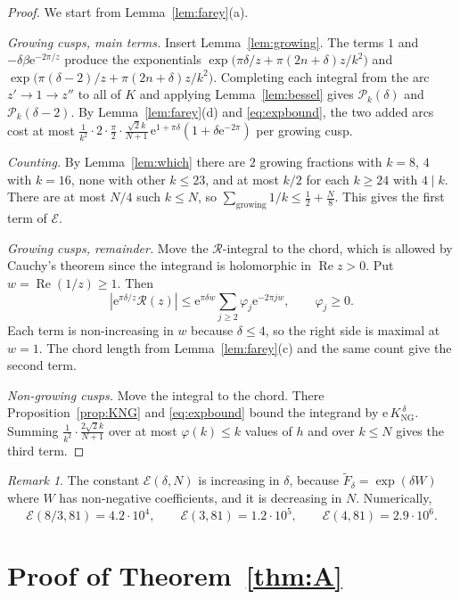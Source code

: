 \documentclass[11pt]{amsart}
\theoremstyle{remark}
\newtheorem{remark}[theorem]{Remark}
\theoremstyle{definition}
\newcommand{\cP}{\mathcal P}
\newcommand{\cE}{\mathcal E}
\newcommand{\cR}{\mathcal R}
\newcommand{\Rea}{\operatorname{Re}}
\newcommand{\e}{\mathrm e}
\newcommand{\KNG}{K_{\mathrm{NG}}}
\begin{document}
\begin{proof}
We start from Lemma~\ref{lem:farey}(a).

\emph{Growing cusps, main terms.} Insert Lemma~\ref{lem:growing}. The terms $1$ and $-\delta\beta\e^{-2\pi/z}$ produce the exponentials $\exp\big(\pi\delta/z+\pi(2n+\delta)z/k^2\big)$ and $\exp\big(\pi(\delta-2)/z+\pi(2n+\delta)z/k^2\big)$. Completing each integral from the arc $z'\to1\to z''$ to all of $K$ and applying Lemma~\ref{lem:bessel} gives $\cP_k(\delta)$ and $\cP_k(\delta-2)$. By Lemma~\ref{lem:farey}(d) and \eqref{eq:expbound}, the two added arcs cost at most $\frac1{k^2}\cdot2\cdot\frac\pi2\cdot\frac{\sqrt2k}{N+1}\,\e^{1+\pi\delta}(1+\delta\e^{-2\pi})$ per growing cusp.

\emph{Counting.} By Lemma~\ref{lem:which} there are $2$ growing fractions with $k=8$, $4$ with $k=16$, none with other $k\le23$, and at most $k/2$ for each $k\ge24$ with $4\mid k$. There are at most $N/4$ such $k\le N$, so $\sum_{\text{growing}}1/k\le\frac12+\frac N8$. This gives the first term of $\cE$.

\emph{Growing cusps, remainder.} Move the $\cR$-integral to the chord, which is allowed by Cauchy's theorem since the integrand is holomorphic in $\Rea z>0$. Put $w=\Rea(1/z)\ge1$. Then
\[
|\e^{\pi\delta/z}\cR(z)|\le\e^{\pi\delta w}\sum_{j\ge2}\varphi_j\e^{-2\pi jw},\qquad \varphi_j\ge0 .
\]
Each term is non-increasing in $w$ because $\delta\le4$, so the right side is maximal at $w=1$. The chord length from Lemma~\ref{lem:farey}(c) and the same count give the second term.

\emph{Non-growing cusps.} Move the integral to the chord. There Proposition~\ref{prop:KNG} and \eqref{eq:expbound} bound the integrand by $\e\,\KNG^{\,\delta}$. Summing $\frac1{k^2}\cdot\frac{2\sqrt2k}{N+1}$ over at most $\varphi(k)\le k$ values of $h$ and over $k\le N$ gives the third term.
\end{proof}

\begin{remark}\label{rem:E}
The constant $\cE(\delta,N)$ is increasing in $\delta$, because $\widetilde F_\delta=\exp(\delta W)$ where $W$ has non-negative coefficients, and it is decreasing in $N$. Numerically,
\[
\cE(8/3,81)=4.2\cdot10^4,\qquad \cE(3,81)=1.2\cdot10^5,\qquad \cE(4,81)=2.9\cdot10^6 .
\]
\end{remark}

\section{Proof of Theorem~\ref{thm:A}}\label{sec:A}
\end{document}
